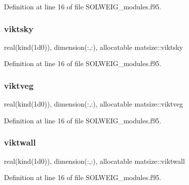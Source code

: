 Definition at line 16 of file S\+O\+L\+W\+E\+I\+G\+\_\+modules.\+f95.

\mbox{\label{namespacematsize_a0e44ed5f655a5ed08b631369eee6d6e6}} 
\subsubsection{\texorpdfstring{viktsky}{viktsky}}
{\footnotesize\ttfamily real(kind(1d0)), dimension(\+:,\+:), allocatable matsize\+::viktsky}



Definition at line 16 of file S\+O\+L\+W\+E\+I\+G\+\_\+modules.\+f95.

\mbox{\label{namespacematsize_ad54fb3efcdbb5a40c1d00fb2795c4482}} 
\subsubsection{\texorpdfstring{viktveg}{viktveg}}
{\footnotesize\ttfamily real(kind(1d0)), dimension(\+:,\+:), allocatable matsize\+::viktveg}



Definition at line 16 of file S\+O\+L\+W\+E\+I\+G\+\_\+modules.\+f95.

\mbox{\label{namespacematsize_a2268200b373b89fec089619c8f9d777e}} 
\subsubsection{\texorpdfstring{viktwall}{viktwall}}
{\footnotesize\ttfamily real(kind(1d0)), dimension(\+:,\+:), allocatable matsize\+::viktwall}



Definition at line 16 of file S\+O\+L\+W\+E\+I\+G\+\_\+modules.\+f95.

